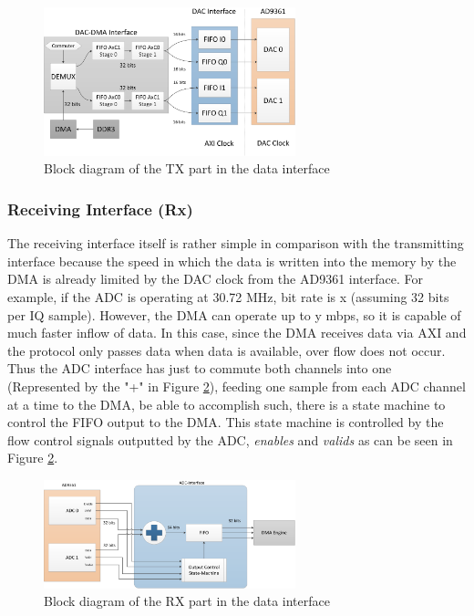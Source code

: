 \begin{figure}[htbp]
    \centering
    \includegraphics[width=0.65\textwidth]{./figures/txdata_if}
    \caption{ Block diagram of the TX part in the data interface
    \label{fig:dataiftx}}
\end{figure}

\subsubsection{Receiving Interface (Rx)}

The receiving interface itself is rather simple in comparison with the
transmitting interface because the speed in which the data is written into the
memory by the DMA is already limited by the DAC clock from the AD9361 interface.
For example, if the ADC is operating at 30.72 MHz, bit rate is x (assuming 32
bits per IQ sample). However, the DMA can operate up to y mbps, so it is capable
of much faster inflow of data. In this case, since the DMA receives data via AXI
and the protocol only passes data when data is available, over flow does not
occur. Thus the ADC interface has just to commute both channels into one
(Represented by the "+" in Figure \ref{fig:dataifrx}), feeding one sample from
each ADC channel at a time to the DMA, be able to accomplish such, there is a
state machine to control the FIFO output to the DMA. This state machine is
controlled by the flow control signals outputted by the ADC, \emph{enables} and
\emph{valids} as can be seen in Figure \ref{fig:dataifrx}.

\begin{figure}[htbp]
    \centering
    \includegraphics[width=0.65\textwidth]{./figures/rxdata_if}
    \caption{ Block diagram of the RX part in the data interface
    \label{fig:dataifrx}}
\end{figure}

